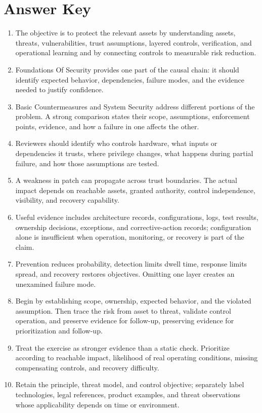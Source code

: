 \documentclass[11pt,letterpaper]{article}
\begin{document}
\section*{Answer Key}
\begin{enumerate}
\item The objective is to protect the relevant assets by understanding assets, threats, vulnerabilities, trust assumptions, layered controls, verification, and operational learning and by connecting controls to measurable risk reduction.
\item Foundations Of Security provides one part of the causal chain: it should identify expected behavior, dependencies, failure modes, and the evidence needed to justify confidence.
\item Basic Countermeasures and System Security address different portions of the problem. A strong comparison states their scope, assumptions, enforcement points, evidence, and how a failure in one affects the other.
\item Reviewers should identify who controls hardware, what inputs or dependencies it trusts, where privilege changes, what happens during partial failure, and how those assumptions are tested.
\item A weakness in patch can propagate across trust boundaries. The actual impact depends on reachable assets, granted authority, control independence, visibility, and recovery capability.
\item Useful evidence includes architecture records, configurations, logs, test results, ownership decisions, exceptions, and corrective-action records; configuration alone is insufficient when operation, monitoring, or recovery is part of the claim.
\item Prevention reduces probability, detection limits dwell time, response limits spread, and recovery restores objectives. Omitting one layer creates an unexamined failure mode.
\item Begin by establishing scope, ownership, expected behavior, and the violated assumption. Then trace the risk from asset to threat, validate control operation, and preserve evidence for follow-up, preserving evidence for prioritization and follow-up.
\item Treat the exercise as stronger evidence than a static check. Prioritize according to reachable impact, likelihood of real operating conditions, missing compensating controls, and recovery difficulty.
\item Retain the principle, threat model, and control objective; separately label technologies, legal references, product examples, and threat observations whose applicability depends on time or environment.
\end{enumerate}
\end{document}
